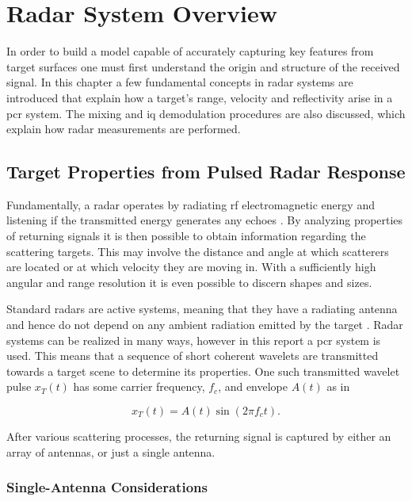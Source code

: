 \chapter{Radar System Overview}

In order to build a model capable of accurately capturing key features from target surfaces one must first understand the origin and structure of the received signal. In this chapter a few fundamental concepts in radar systems are introduced that explain how a target's range, velocity and reflectivity arise in a \gls{pcr} system. The mixing and \gls{iq} demodulation procedures are also discussed, which explain how radar measurements are performed.  

\section{Target Properties from Pulsed Radar Response}
Fundamentally, a radar operates by radiating \gls{rf} electromagnetic energy and listening if the transmitted energy generates any echoes \citep{skolnik_2009}. By analyzing properties of returning signals it is then possible to obtain information regarding the scattering targets. This may involve the distance and angle at which scatterers are located or at which velocity they are moving in. With a sufficiently high angular and range resolution it is even possible to discern shapes and sizes.  

Standard radars are active systems, meaning that they have a radiating antenna and hence do not depend on any ambient radiation emitted by the target \citep{richards_2014}. Radar systems can be realized in many ways, however in this report a \gls{pcr} system is used. This means that a sequence of short coherent wavelets are transmitted towards a target scene to determine its properties. One such transmitted wavelet pulse $x_T(t)$ has some carrier frequency, $f_c$, and envelope $A(t)$ as in

\begin{equation}\label{eq:trans}
	x_T(t)
	= A(t)\sin(2\pi f_c t).
\end{equation}

After various scattering processes, the returning signal is captured by either an array of antennas, or just a single antenna.

\subsection{Single-Antenna Considerations}

